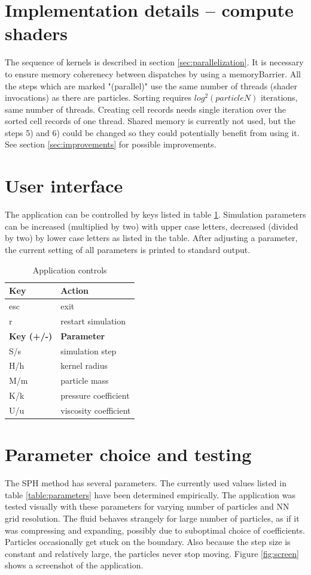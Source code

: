 \documentclass[a4paper,report]{IEEEtran}
\begin{document}
\section{Implementation details -- compute shaders}
The sequence of kernels is described in section \ref{sec:parallelization}. It is necessary to ensure memory coherenecy between dispatches by using a memoryBarrier. All the steps which are marked "(parallel)" use the same number of threads (shader invocations) as there are particles. Sorting requires $log^2(particleN)$ iterations, same number of threads. Creating cell records needs single iteration over the sorted cell records of one thread. Shared memory is currently not used, but the steps 5) and 6) could be changed so they could potentially benefit from using it. See section \ref{sec:improvements} for possible improvements.

\section{User interface}
The application can be controlled by keys listed in table \ref{table:controls}. Simulation parameters can be increased (multiplied by two) with upper case letters, decreased (divided by two) by lower case letters as listed in the table. After adjusting a parameter, the current setting of all parameters is printed to standard output.
\begin{table}[h]
	\normalsize
	\centering
	\begin{tabular}{|l|l|}
		\hline
		\textbf{Key} & \textbf{Action} \\
		\hline
		\hline
		esc & exit \\
		r & restart simulation \\
		\hline
		\hline
		\textbf{Key (+/-)} & \textbf{Parameter} \\
		\hline
		\hline
		S/s & simulation step \\
		H/h & kernel radius \\
		M/m & particle mass \\
		K/k & pressure coefficient \\
		U/u & viscosity coefficient \\
		\hline
	\end{tabular}
	\caption{Application controls}
	\label{table:controls}
\end{table}

\section{Parameter choice and testing}
The SPH method has several parameters. The currently used values listed in table \ref{table:parameters} have been determined empirically. The application was tested visually with these parameters for varying number of particles and NN grid resolution. The fluid behaves strangely for large number of particles, as if it was compressing and expanding, possibly due to suboptimal choice of coefficients. Particles occasionally get stuck on the boundary. Also because the step size is constant and relatively large, the particles never stop moving. Figure \ref{fig:screen} shows a screenshot of the application.
\end{document}
